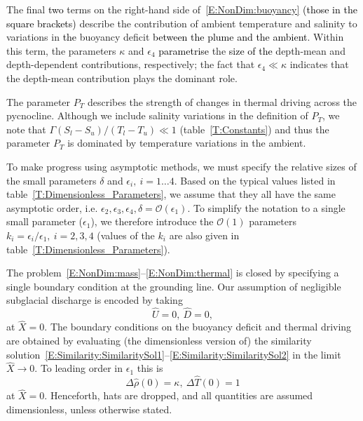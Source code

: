 \documentclass[openacc]{rsproca_new}%
\newcommand{\order}[1]{\mathcal{O}(#1)}
\newcommand{\red}[1]{{\color{red} #1}}
\newcommand{\blue}[1]{{\color{blue} #1}}
\newcommand{\rout}[1]{\red{\st{#1}}}\newcommand{\ab}[1]{\textcolor{Green}{#1}}\newcommand{\about}[1]{\textcolor{Cyan}{\sout{#1}}}
\renewcommand{\rout}[1]{{}} %
\renewcommand{\blue}[1]{{\textcolor{black}{#1}}} %
\renewcommand{\red}[1]{{}} %
\newcommand{\epsone}{\epsilon_{1}} %
\newcommand{\epstwo}{\epsilon_{2}} %
\newcommand{\epsthree}{\epsilon_{3}} %
\newcommand{\epsfour}{\epsilon_{4}}
\newcommand{\lt}{\delta} %
\newcommand{\Pt}{\textit{P}_T}
\begin{document}
The final \blue{two} terms on the right-hand side of~\eqref{E:NonDim:buoyancy} \blue{(those in the square brackets)} describe\rout{s} the contribution of \rout{gradients }ambient temperature and salinity to variations in \blue{the} buoyancy deficit \blue{between the plume and the ambient}. Within this term, the parameters $\kappa$ and $\epsfour$ \blue{parametrise} \rout{describe }the \blue{size of the} depth-mean and depth-dependent contributions, respectively; the fact that $\epsfour \ll \kappa$ indicates that the depth-mean contribution plays the dominant role.

The parameter $\Pt$ describes the strength of changes in thermal driving across the pycnocline. Although we include salinity variations in the definition of $\Pt$, we note that $\Gamma (S_l - S_u)/(T_l - T_u) \ll 1$ (table~\ref{T:Constants}) and thus the parameter $\Pt$ is dominated by temperature variations in the ambient.

To make progress using asymptotic methods, we must specify the relative sizes of the small parameters $\lt$ and $\epsilon_i, ~i = 1\dots4$. Based on the typical values listed in table~\ref{T:Dimensionless_Parameters}, we assume that they all have the same asymptotic order, i.e. $\epstwo, \epsthree, \epsfour, \lt = \order{\epsone}$. To simplify the notation to a single small parameter ($\epsone$), we therefore introduce the $\order{1}$ parameters $k_i =\epsilon_i/ \epsone,~i = 2,3,4$ (values of the $k_i$ are also given in table~\ref{T:Dimensionless_Parameters}).

The problem~\eqref{E:NonDim:mass}--\eqref{E:NonDim:thermal} is closed by specifying a single boundary condition at the grounding line. Our assumption of negligible subglacial discharge is encoded by taking
\begin{equation}\label{E:NonDim:IC1}
\hat{U} =0,~\hat{D} = 0,
\end{equation}
at $\hat{X} = 0$. The boundary conditions on the buoyancy deficit and thermal driving are obtained by evaluating (the dimensionless version of) the similarity solution~\eqref{E:Similarity:SimilaritySol1}--\eqref{E:Similarity:SimilaritySol2} in the limit $\hat{X} \to 0$. To leading order in $\epsone$ this is
\begin{equation}\label{E:NonDim:IC2}
  \Delta\hat{\rho}(0) = \kappa,~\Delta \hat{T}(0) = 1  
\end{equation}
at $\hat{X} = 0$. Henceforth, hats are dropped, and all quantities are assumed dimensionless, unless otherwise stated.
\end{document}
